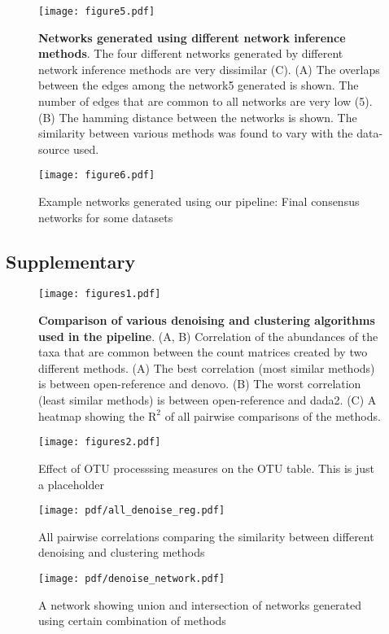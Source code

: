 \begin{figure}[h]
  \centering
  \texttt{[image: figure5.pdf]}
  \caption{
    \textbf{Networks generated using different network inference methods}.
    The four different networks generated by different network inference methods are very dissimilar (C).
    (A) The overlaps between the edges among the network5 generated is shown. The number of edges that are common to all networks are very low (5).
    (B) The hamming distance between the networks is shown. The similarity between various methods was found to vary with the data-source used.
}
  \label{fig:figure5}
\end{figure}

\begin{figure}[h]
  \centering
  \texttt{[image: figure6.pdf]}
  \caption{Example networks generated using our pipeline: Final consensus networks for some datasets}
  \label{fig:figure6}
\end{figure}

\FloatBarrier

\subsection*{Supplementary}%

\begin{figure}[h]
  \centering
  \texttt{[image: figures1.pdf]}
  \caption{
    \textbf{Comparison of various denoising and clustering algorithms used in the pipeline}.
    (A, B) Correlation of the abundances of the taxa that are common between the count matrices created by two different methods.
    (A) The best correlation (most similar methods) is between open-reference and denovo.
    (B) The worst correlation (least similar methods) is between open-reference and dada2.
    (C) A heatmap showing the $\mathrm{R}^2$ of all pairwise comparisons of the methods.
  }
  \label{fig:figures1}
\end{figure}

\begin{figure}[h]
  \centering
  \texttt{[image: figures2.pdf]}
  \caption{Effect of OTU processsing measures on the OTU table. This is just a placeholder}
  \label{fig:figures2}
\end{figure}

\begin{figure}[h]
  \centering
  \texttt{[image: pdf/all\_denoise\_reg.pdf]}
  \caption{All pairwise correlations comparing the similarity between different denoising and clustering methods}
  \label{fig:figures2}
\end{figure}

\begin{figure}[h]
  \centering
  \texttt{[image: pdf/denoise\_network.pdf]}
  \caption{A network showing union and intersection of networks generated using certain combination of methods}
  \label{fig:pdf/denoise_network}
\end{figure}




